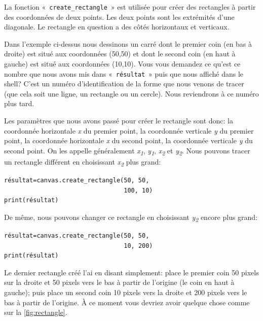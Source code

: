 La fonction « \texttt{create\_rectangle} » est utilisée pour créer des rectangles à partir des coordonnées de deux points. Les deux points sont les extrémités d'une diagonale. Le rectangle en question a des côtés horizontaux et verticaux.

Dans l'exemple ci-dessus nous dessinons un carré dont le premier coin (en bas à droite) est situé aux coordonnées (50,50) et dont le second coin (en haut à gauche) est situé aux coordonnées (10,10).
Vous vous demandez ce qu'est ce nombre que nous avons mis dans « \texttt{résultat} » puis que nous affiché dans le shell? C'est un numéro d'identification de la forme que nous venons de tracer (que cela soit une ligne, un rectangle ou un cercle). Nous reviendrons à ce numéro plus tard.

Les paramètres que nous avons passé pour créer le rectangle sont donc: la coordonnée horizontale \emph{x} du premier point, la coordonnée verticale \emph{y} du premier point, la coordonnée horizontale \emph{x} du second point, la coordonnée verticale \emph{y} du second point. On les appelle généralement \emph{x\textsubscript{1}}, \emph{y\textsubscript{1}}, \emph{x\textsubscript{2}} et \emph{y\textsubscript{2}}. Nous pouvons tracer un rectangle différent en choisissant \emph{x\textsubscript{2}} plus grand:

\begin{Verbatim}[frame=single,rulecolor=\color{mbleu}, label=à taper]
résultat=canvas.create_rectangle(50, 50, 
                                 100, 10)
print(résultat)
\end{Verbatim}

De même, nous pouvons changer ce rectangle en choisissant \emph{y\textsubscript{2}} encore plus grand:

\begin{Verbatim}[frame=single,rulecolor=\color{mbleu}, label=à taper]
résultat=canvas.create_rectangle(50, 50, 
                                 10, 200)
print(résultat)
\end{Verbatim}


Le dernier rectangle créé l'ai en disant simplement: place le premier coin 50 pixels sur la droite et 50 pixels vers le bas à partir de l'origine (le coin en haut à gauche); puis place un second coin 10 pixels vers la droite et 200 pixels vers le bas à partir de l'origine. À ce moment vous devriez avoir quelque chose comme sur la \autoref{fig:rectangle}.

